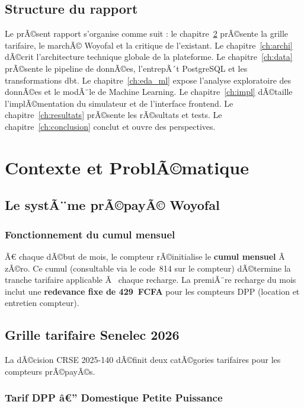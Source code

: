 \documentclass[12pt,a4paper]{report}
\begin{document}
\section{Structure du rapport}

Le prÃ©sent rapport s'organise comme suit : le chapitre~\ref{ch:contexte} prÃ©sente la grille tarifaire, le marchÃ© Woyofal et la critique de l'existant. Le chapitre~\ref{ch:archi} dÃ©crit l'architecture technique globale de la plateforme. Le chapitre~\ref{ch:data} prÃ©sente le pipeline de donnÃ©es, l'entrepÃ´t PostgreSQL et les transformations dbt. Le chapitre~\ref{ch:eda_ml} expose l'analyse exploratoire des donnÃ©es et le modÃ¨le de Machine Learning. Le chapitre~\ref{ch:impl} dÃ©taille l'implÃ©mentation du simulateur et de l'interface frontend. Le chapitre~\ref{ch:resultats} prÃ©sente les rÃ©sultats et tests. Le chapitre~\ref{ch:conclusion} conclut et ouvre des perspectives.

\chapter{Contexte et ProblÃ©matique}
\label{ch:contexte}

\section{Le systÃ¨me prÃ©payÃ© Woyofal}

\subsection*{Fonctionnement du cumul mensuel}
Ã€ chaque dÃ©but de mois, le compteur rÃ©initialise le \textbf{cumul mensuel} Ã  zÃ©ro. Ce cumul (consultable via le code~814 sur le compteur) dÃ©termine la tranche tarifaire applicable Ã  chaque recharge. La premiÃ¨re recharge du mois inclut une \textbf{redevance fixe de 429~FCFA} pour les compteurs DPP (location et entretien compteur).

\section{Grille tarifaire Senelec 2026}

La dÃ©cision CRSE 2025-140 dÃ©finit deux catÃ©gories tarifaires pour les compteurs prÃ©payÃ©s.

\subsection{Tarif DPP â€” Domestique Petite Puissance}
\end{document}
